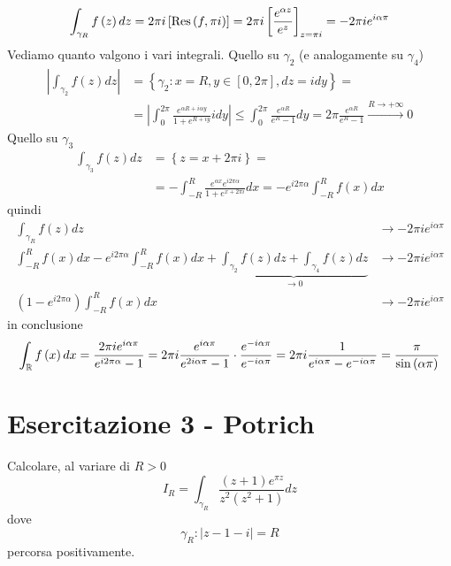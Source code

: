 \begin{equation*}
\int _{\gamma _{R}} f\left(z\right) dz = 2\pi i\left[\operatorname{Res} \left(f,\pi i\right)\right] = 2\pi i\left[\frac{e^{\alpha z}}{e^{z}}\right]_{z = \pi i} = - 2\pi ie^{i\alpha \pi }
\end{equation*}
Vediamo quanto valgono i vari integrali. Quello su $\gamma _{2}$ (e analogamente su $\gamma _{4}$)
\begin{align*}
\left| \int _{\gamma _{2}} f\left(z\right) dz\right|  & = \left\{\gamma _{2} :x = R,y\in \left[ 0,2\pi \right] ,dz = idy\right\} = \\
 & = \left| \int ^{2\pi }_{0}\frac{e^{\alpha R + i\alpha y}}{1 + e^{R + iy}} idy\right| \leq \int ^{2\pi }_{0}\frac{e^{\alpha R}}{e^{R} - 1} dy = 2\pi \frac{e^{\alpha R}}{e^{R} - 1}\xrightarrow{R\rightarrow + \infty } 0
\end{align*}
Quello su $\gamma _{3}$
\begin{align*}
\int _{\gamma _{3}} f\left(z\right) dz & = \left\{z = x + 2\pi i\right\} = \\
 & = - \int ^{R}_{ - R}\frac{e^{\alpha x} e^{i2\pi \alpha }}{1 + e^{x + 2\pi i}} dx = -e^{i2\pi \alpha }\int ^{R}_{ - R} f\left(x\right) dx
\end{align*}
quindi
\begin{align*}
\int _{\gamma _{R}} f\left(z\right) dz & \rightarrow - 2\pi ie^{i\alpha \pi }\\
\int ^{R}_{ - R} f\left(x\right) dx - e^{i2\pi \alpha }\int ^{R}_{ - R} f\left(x\right) dx + \underbrace{\int _{\gamma _{2}} f\left(z\right) dz + \int _{\gamma _{4}} f\left(z\right) dz}_{\rightarrow 0} & \rightarrow - 2\pi ie^{i\alpha \pi }\\
\left(1 - e^{i2\pi \alpha }\right)\int ^{R}_{ - R} f\left(x\right) dx & \rightarrow - 2\pi ie^{i\alpha \pi }
\end{align*}
in conclusione
\begin{equation*}
\int _{\mathbb{R} } f\left(x\right) dx = \frac{2\pi ie^{i\alpha \pi }}{e^{i2\pi \alpha } - 1} = 2\pi i\frac{e^{i\alpha \pi }}{e^{2i\alpha \pi } - 1} \cdot \frac{e^{ - i\alpha \pi }}{e^{ - i\alpha \pi }} = 2\pi i\frac{1}{e^{i\alpha \pi } - e^{ - i\alpha \pi }} = \frac{\pi }{\sin\left(\alpha \pi \right)}
\end{equation*}
\chapter{Esercitazione 3 - Potrich}
\ParteEsercizi
\Esercizio{}

Calcolare, al variare di $R > 0$
\begin{equation*}
I_{R} = \int _{\gamma _{R}}\frac{\left(z + 1\right) e^{\pi z}}{z^{2}\left(z^{2} + 1\right)} dz
\end{equation*}
dove
\begin{equation*}
\gamma _{R} :\left| z - 1 - i\right| = R
\end{equation*}
percorsa positivamente.
\Esercizio{}

